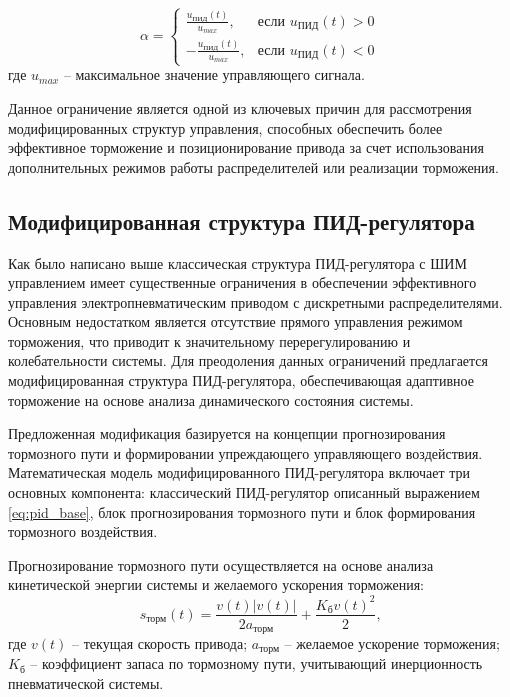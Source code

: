 \begin{equation}
	\alpha = \begin{cases}
		\frac{u_\text{ПИД}(t)}{u_{max}},  & \text{если } u_\text{ПИД}(t) > 0 \\
		-\frac{u_\text{ПИД}(t)}{u_{max}}, & \text{если } u_\text{ПИД}(t) < 0
	\end{cases}
\end{equation}
где $u_{max}$ -- максимальное значение управляющего сигнала.

Данное ограничение является одной из ключевых причин для рассмотрения модифицированных
структур управления, способных обеспечить более эффективное торможение и позиционирование
привода за счет использования дополнительных режимов работы распределителей или реализации
торможения.

\subsection{Модифицированная структура ПИД-регулятора}\label{subsec:ch3/sec2/sub3}

Как было написано выше классическая структура ПИД-регулятора с ШИМ управлением имеет существенные ограничения
в обеспечении эффективного управления электропневматическим приводом с дискретными распределителями.
Основным недостатком является отсутствие прямого управления режимом торможения, что приводит к значительному
перерегулированию и колебательности системы. Для преодоления данных ограничений предлагается модифицированная
структура ПИД-регулятора, обеспечивающая адаптивное торможение на основе анализа динамического состояния системы.

Предложенная модификация базируется на концепции прогнозирования тормозного пути и формировании упреждающего
управляющего воздействия. Математическая модель модифицированного ПИД-регулятора включает три основных
компонента: классический ПИД-регулятор описанный выражением \ref{eq:pid_base}, блок прогнозирования тормозного пути
и блок формирования тормозного воздействия.

Прогнозирование тормозного пути осуществляется на основе анализа
кинетической энергии системы и желаемого ускорения торможения:
\begin{equation}\label{eq:braking_prediction}
	s_{\text{торм}}(t) = \frac{v(t)|v(t)|}{2a_{\text{торм}}} + \frac{K_{\text{б}}v(t)^2}{2}\text{,}
\end{equation}
где $v(t)$ -- текущая скорость привода;
$a_{\text{торм}}$ -- желаемое ускорение торможения;
$K_{\text{б}}$ -- коэффициент запаса по тормозному пути, учитывающий инерционность пневматической системы.

